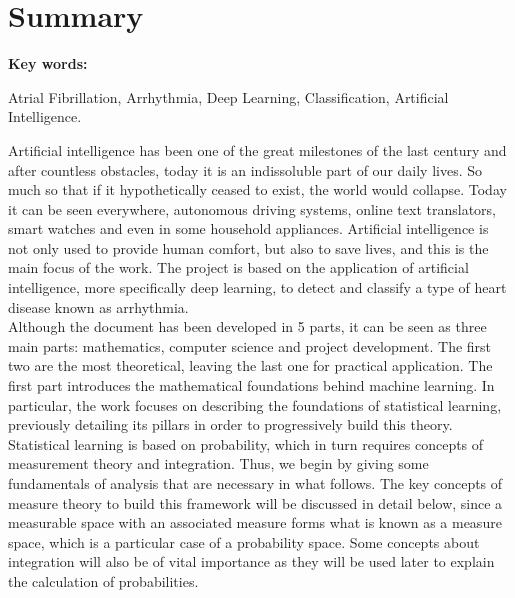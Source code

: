 %

\chapter{Summary}

    \begin{center}
        \textbf{Key words:}
        \begin{center}
            Atrial Fibrillation, Arrhythmia, Deep Learning, Classification, Artificial Intelligence. 
        \end{center}
    \end{center}

    Artificial intelligence has been one of the great milestones of the last century and after countless obstacles, today it is an indissoluble part of our daily lives. So much so that if it hypothetically ceased to exist, the world would collapse. Today it can be seen everywhere, autonomous driving systems, online text translators, smart watches and even in some household appliances. Artificial intelligence is not only used to provide human comfort, but also to save lives, and this is the main focus of the work. The project is based on the application of artificial intelligence, more specifically deep learning, to detect and classify a type of heart disease known as arrhythmia. \\

    Although the document has been developed in 5 parts, it can be seen as three main parts: mathematics, computer science and project development. The first two are the most theoretical, leaving the last one for practical application. The first part introduces the mathematical foundations behind machine learning. In particular, the work focuses on describing the foundations of statistical learning, previously detailing its pillars in order to progressively build this theory. Statistical learning is based on probability, which in turn requires concepts of measurement theory and integration. Thus, we begin by giving some fundamentals of analysis that are necessary in what follows. The key concepts of measure theory to build this framework will be discussed in detail below, since a measurable space with an associated measure forms what is known as a measure space, which is a particular case of a probability space. Some concepts about integration will also be of vital importance as they will be used later to explain the calculation of probabilities. \\

